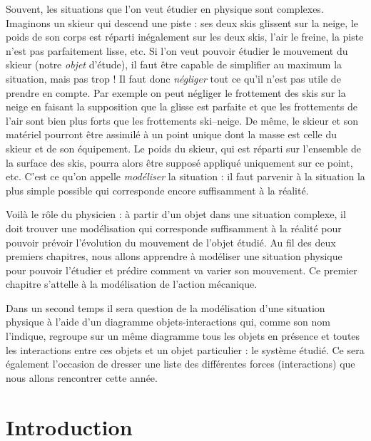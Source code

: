 \begin{cadre}
Souvent, les situations que l'on veut étudier en physique sont complexes. Imaginons un skieur qui descend une piste : ses deux skis glissent sur la neige, le poids de son corps est réparti inégalement sur les deux skis, l'air le freine, la piste n'est pas parfaitement lisse, etc. Si l'on veut pouvoir étudier le mouvement du skieur (notre \emph{objet} d'étude), il faut être capable de simplifier au maximum la situation, mais pas trop ! Il faut donc \emph{négliger} tout ce qu'il n'est pas utile de prendre en compte. Par exemple on peut négliger le frottement des skis sur la neige en faisant la supposition que la glisse est parfaite et que les frottements de l'air sont bien plus forts que les frottements ski--neige. De même, le skieur et son matériel pourront être assimilé à un point unique dont la masse est celle du skieur et de son équipement. Le poids du skieur, qui est réparti sur l'ensemble de la surface des skis, pourra alors être supposé appliqué uniquement sur ce point, etc. C'est ce qu'on appelle \emph{modéliser} la situation : il faut parvenir à la situation la plus simple possible qui corresponde encore suffisamment à la réalité.  

\vspace{.5em}

Voilà le rôle du physicien : à partir d'un objet dans une situation complexe, il doit trouver une modélisation qui corresponde suffisamment à la réalité pour pouvoir prévoir l'évolution du mouvement de l'objet étudié. Au fil des deux premiers chapitres, nous allons apprendre à modéliser une situation physique pour pouvoir l'étudier et prédire comment va varier son mouvement. Ce premier chapitre s'attelle à la modélisation de l'action mécanique.

\vspace{.5em}

Dans un second temps il sera question de la modélisation d'une situation physique à l'aide d'un diagramme objets-interactions qui, comme son nom l'indique, regroupe sur un même diagramme tous les objets en présence et toutes les interactions entre ces objets et un objet particulier : le système étudié. Ce sera également l'occasion de dresser une liste des différentes forces (interactions) que nous allons rencontrer cette année.
\end{cadre}

\section{Introduction}

